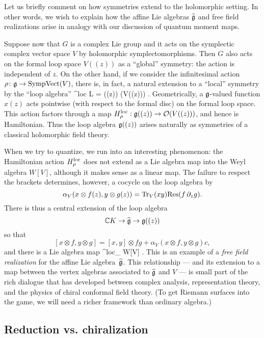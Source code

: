 \documentclass[11pt]{amsart}
\begin{document}
Let us briefly comment on how symmetries extend to the holomorphic setting.
In other words, we wish to explain how the affine Lie algebras $\widehat{\mathfrak g}$ and free field realizations arise in analogy with our discussion of quantum moment maps.

Suppose now that $G$ is a complex Lie group and it acts on the symplectic complex vector space $V$ by holomorphic symplectomorphisms.
Then $G$ also acts on the formal loop space $V((z))$ as a ``global'' symmetry:
the action is independent of $z$.
On the other hand, if we consider the infinitesimal action $\rho \colon \mathfrak g \to {\rm SympVect}(V)$,
there is, in fact, a natural extension to a ``local'' symmetry by the ``loop algebra'' 
\beqn
\rho^{\rm loc} \colon L \fg = \fg ((z)) (V((z))) .
\eeqn
Geometrically, a $\mathfrak g$-valued function $x(z)$ acts pointwise (with respect to the formal disc) on the formal loop space.
This action factors through a map $H_\rho^{\rm loc}: \mathfrak g((z)) \to \mathcal O(V((z)))$,
and hence is Hamiltonian.
Thus the loop algebra $\mathfrak g((z))$ arises naturally as symmetries of a classical holomorphic field theory.

When we try to quantize, we run into an interesting phenomenon:
the Hamiltonian action $H_\rho^{\rm loc}$ does not extend as a Lie algebra map into the Weyl algebra $W[V]$,
although it makes sense as a linear map.
The failure to respect the brackets determines, however, a cocycle on the loop algebra
by
\[
\alpha_V( x \otimes f(z) , y \otimes g(z)) = {\rm Tr}_V(xy) {\rm Res}(f \, \partial_z g).
\]
There is thus a central extension of the loop algebra 
\[
\mathbb C K\to \widehat{\mathfrak g} \to \mathfrak g((z))
\]
so that 
\[
[x \otimes f, y \otimes g] = [x,y] \otimes fg + \alpha_V( x \otimes f , y \otimes g) c,
\]
and there is a Lie algebra map
\beqn\label{eqn:freefield1}
^{\rm loc}_\rho \colon \widehat{\fg} \to W[V] .
\eeqn
This is an example of a {\em free field realization} for the affine Lie algebra~$\widehat{\mathfrak g}$.
This relationship --- and its extension to a map between the vertex algebras associated to $\widehat{\mathfrak g}$ and $V$ --- is small part of the rich dialogue that has developed between complex analysis, representation theory, and the physics of chiral conformal field theory.
(To get Riemann surfaces into the game, we will need a richer framework than ordinary algebra.)

\subsection{Reduction vs. chiralization}
\end{document}

